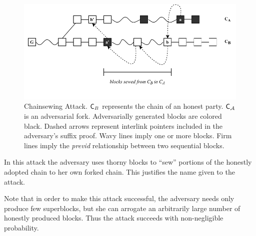 \begin{figure}[h!]
	\begin{center}
		\includegraphics[width=\columnwidth]{figures/chainsewing_attack.pdf}
	\end{center}
	\caption{Chainsewing Attack. $\mathsf{C}_B$ represents the chain of an honest party. $\mathsf{C}_\mathcal{A}$ is an adversarial fork. Adversarially generated blocks are colored black. Dashed arrows represent interlink pointers included in the adversary's suffix proof. Wavy lines imply one or more blocks. Firm lines imply the \emph{previd} relationship between two sequential blocks.}
	\label{fig:attack}
\end{figure}

In this attack the adversary uses thorny blocks to ``sew'' portions of the
honestly adopted chain to her own forked chain. This justifies the name given to
the attack.

Note that in order to make this attack successful, the adversary needs only
produce few superblocks, but she can arrogate an arbitrarily large number of
honestly produced blocks. Thus the attack succeeds with non-negligible
probability.
